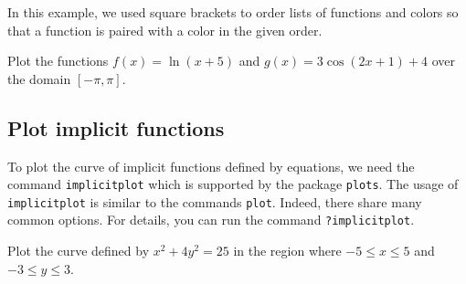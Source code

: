 \documentclass[
  12pt]{elegantbook}
\begin{document}
In this example, we used square brackets to order lists of functions and colors so that a function is paired with a color in the given order.

\begin{exercise}
Plot the functions \(f(x)=\ln(x+5)\) and \(g(x)=3\cos(2x+1)+4\) over the domain \([-\pi, \pi]\).
\end{exercise}

\hypertarget{plot-implicit-functions}{%
\subsection{Plot implicit functions}\label{plot-implicit-functions}}

To plot the curve of implicit functions defined by equations, we need the command \texttt{implicitplot} which is supported by the package \texttt{plots}. The usage of \texttt{implicitplot} is similar to the commands \texttt{plot}. Indeed, there share many common options. For details, you can run the command \texttt{?implicitplot}.

\begin{example}
Plot the curve defined by \(x^2+4y^2=25\) in the region where \(-5\le x\le 5\) and \(-3\le y\le 3\).
\end{example}
\end{document}
